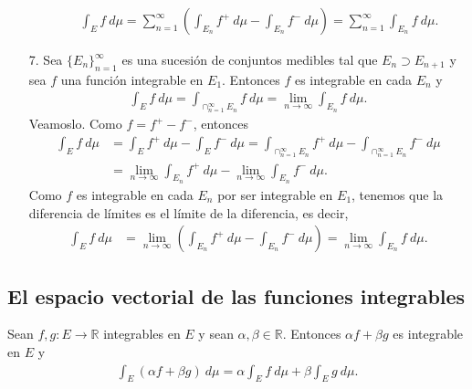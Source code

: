 \begin{obs}
\begin{enumerate}
\begin{enumerate}
\begin{align*}
            \int_{E}{f \ d\mu} = \sum_{n=1}^{\infty}{\left(\int_{E_n}{f^+\ d\mu } - \int_{E_n}{f^- \ d\mu}\right)} = \sum_{n=1}^{\infty}{\int_{E_n}{f \ d\mu}}.
        \end{align*}
    \end{enumerate}
    \item[7.] Sea $\{E_n\}_{n=1}^{\infty}$ es una sucesión de conjuntos medibles tal que $E_n \supset E_{n+1}$ y sea $f$ una función integrable en $E_1$. Entonces $f$ es integrable en cada $E_n$ y
    \begin{align*}
        \int_{E}{f \ d\mu} = \int_{\cap_{n=1}^{\infty}{E_n}}{f \ d\mu} = \lim_{n \to \infty}{\int_{E_n}{f \ d\mu}}.
    \end{align*}
     Veamoslo. Como $f = f^+ - f^-$, entonces
     \begin{align*}
          \int_{E}{f \ d\mu} &= \int_{E}{f^+ \ d\mu} - \int_{E}{f^- \ d\mu} = \int_{\cap_{n=1}^{\infty}{E_n}}{f^+ \ d\mu} - \int_{\cap_{n=1}^{\infty}{E_n}}{f^- \ d\mu}\\
           &= \lim_{n \to \infty}{\int_{E_n}{f^+ \ d\mu}} - \lim_{n \to \infty}{\int_{E_n}{f^- \ d\mu}}.
     \end{align*}
     Como $f$ es integrable en cada $E_n$ por ser integrable en $E_1$, tenemos que la diferencia de límites es el límite de la diferencia, es decir,
     \begin{align*}
         \int_{E}{f \ d\mu} &= \lim_{n \to \infty}{\left( \int_{E_n}{f^+ \ d\mu} - \int_{E_n}{f^- \ d\mu}\right)} = \lim_{n \to \infty}{\int_{E_n}{f \ d\mu}}.
     \end{align*}
\end{enumerate}
\end{obs}

\subsection{El espacio vectorial de las funciones integrables}

\begin{prop}
Sean $f,g: E \longrightarrow \mathbb{R}$ integrables en $E$ y sean $\alpha,\beta \in \mathbb{R}$. Entonces $\alpha f + \beta g$ es integrable en $E$ y
\begin{align*}
    \int_{E}{(\alpha f + \beta g) \ d\mu} = \alpha\int_{E}{f \ d\mu} + \beta\int_{E}{g \ d\mu}.
\end{align*}
\end{prop}

